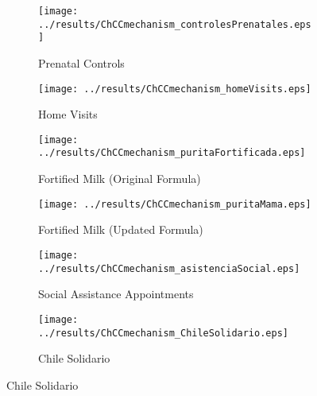 \documentclass[12pt]{article}
\begin{document}
\begin{spacing}{1.4}
\thispagestyle{empty}
\begin{figure}[htpb!]
  \begin{center}
    \caption{ChCC roll-out and Pregnancy Inputs Disbursed}
    \label{mech-plots}
    \begin{subfigure}{.5\textwidth}
      \centering
      \texttt{[image: ../results/ChCCmechanism\_controlesPrenatales.eps]}
      \caption{Prenatal Controls}
      \label{mech-prenatal}
    \end{subfigure}%
    \begin{subfigure}{.5\textwidth}
      \centering
      \texttt{[image: ../results/ChCCmechanism\_homeVisits.eps]}
      \caption{Home Visits}
      \label{mech-visits}
    \end{subfigure}
    \begin{subfigure}{.5\textwidth}
      \centering
      \texttt{[image: ../results/ChCCmechanism\_puritaFortificada.eps]}
      \caption{Fortified Milk (Original Formula)}
      \label{mech-purita}
    \end{subfigure}%
    \begin{subfigure}{.5\textwidth}
      \centering
      \texttt{[image: ../results/ChCCmechanism\_puritaMama.eps]}
      \caption{Fortified Milk (Updated Formula)}
      \label{mech-mama}
    \end{subfigure}
    \begin{subfigure}{.5\textwidth}
      \centering
      \texttt{[image: ../results/ChCCmechanism\_asistenciaSocial.eps]}
      \caption{Social Assistance Appointments}
      \label{mech-social}
    \end{subfigure}%
    \begin{subfigure}{.5\textwidth}
      \centering
      \texttt{[image: ../results/ChCCmechanism\_ChileSolidario.eps]}
      \caption{Chile Solidario}
      \label{mech-CS}
    \end{subfigure}
  \end{center}
\end{figure}



\end{spacing}
\end{document}
